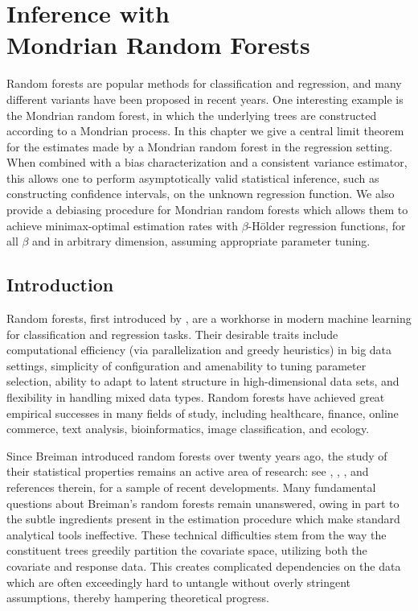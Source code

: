 
\chapter[Inference with Mondrian Random Forests]%
{Inference with \\ Mondrian Random Forests}
\label{ch:mondrian}

Random forests are popular methods for classification and regression, and many
different variants have been proposed in recent years. One interesting example
is the Mondrian random forest, in which the underlying trees are constructed
according to a Mondrian process. In this chapter we give a central limit theorem
for the estimates made by a Mondrian random forest in the regression setting.
When combined with a bias characterization and a consistent variance estimator,
this allows one to perform asymptotically valid statistical inference, such as
constructing confidence intervals, on the unknown regression function. We also
provide a debiasing procedure for Mondrian random forests which allows them to
achieve minimax-optimal estimation rates with $\beta$-H{\"o}lder regression
functions, for all $\beta$ and in arbitrary dimension, assuming appropriate
parameter tuning.

\section{Introduction}

Random forests, first introduced by \citet{breiman2001random}, are a workhorse
in modern machine learning for classification and regression tasks.
Their desirable traits include computational efficiency (via parallelization
and greedy heuristics) in big data settings, simplicity of configuration and
amenability to tuning parameter selection, ability to adapt to latent structure
in high-dimensional data sets, and flexibility in handling mixed data types.
Random forests have achieved great empirical successes in many fields of study,
including healthcare, finance, online commerce, text analysis, bioinformatics,
image classification, and ecology.

Since Breiman introduced random forests over twenty years ago, the study of
their statistical properties remains an active area of research: see
\citet{scornet2015consistency}, \citet{chi2022asymptotic},
\citet{klusowski2024large}, and references therein, for a sample of recent
developments. Many fundamental questions about Breiman's random forests remain
unanswered, owing in part to the subtle ingredients present in the estimation
procedure which make standard analytical tools ineffective. These technical
difficulties stem from the way the constituent trees greedily partition the
covariate space, utilizing both the covariate and response data. This creates
complicated dependencies on the data which are often exceedingly hard to
untangle without overly stringent assumptions, thereby hampering theoretical
progress.

